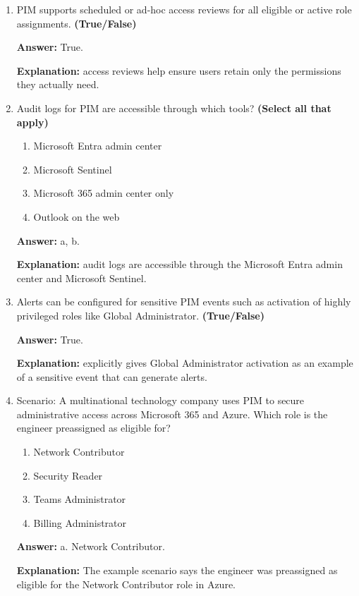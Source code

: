 \documentclass[10pt]{article}
\begin{document}
\begin{enumerate}[leftmargin=*]
\textbf{Explanation:} This is the exact justification provided in the example scenario.

\item PIM supports scheduled or ad-hoc access reviews for all eligible or active role assignments. \textbf{(True/False)}

\textbf{Answer:} True.

\textbf{Explanation:} access reviews help ensure users retain only the permissions they actually need.

\item Audit logs for PIM are accessible through which tools? \textbf{(Select all that apply)}
\begin{enumerate}[label=\alph*., leftmargin=1.5em]
\item Microsoft Entra admin center
\item Microsoft Sentinel
\item Microsoft 365 admin center only
\item Outlook on the web
\end{enumerate}
\textbf{Answer:} a, b.

\textbf{Explanation:} audit logs are accessible through the Microsoft Entra admin center and Microsoft Sentinel.

\item Alerts can be configured for sensitive PIM events such as activation of highly privileged roles like Global Administrator. \textbf{(True/False)}

\textbf{Answer:} True.

\textbf{Explanation:} explicitly gives Global Administrator activation as an example of a sensitive event that can generate alerts.

\item Scenario: A multinational technology company uses PIM to secure administrative access across Microsoft 365 and Azure. Which role is the engineer preassigned as eligible for?
\begin{enumerate}[label=\alph*., leftmargin=1.5em]
\item Network Contributor
\item Security Reader
\item Teams Administrator
\item Billing Administrator
\end{enumerate}
\textbf{Answer:} a. Network Contributor.

\textbf{Explanation:} The example scenario says the engineer was preassigned as eligible for the Network Contributor role in Azure.


\end{enumerate}
\end{document}
